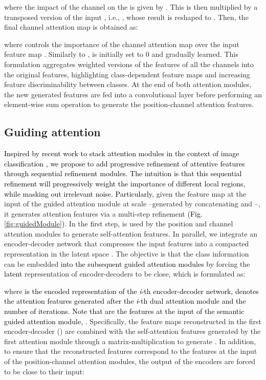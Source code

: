 \documentclass[journal]{IEEEtran}
\begin{document}
where the impact of the  channel on the  is given by . This is then multiplied by a transposed version of the input , i.e., , whose result is reshaped to . Then, the final channel attention map is obtained as:



where  controls the importance of the channel attention map over the input feature map . Similarly to ,  is initially set to 0 and gradually learned. This formulation aggregates weighted versions of the features of all the channels into the original features, highlighting class-dependent feature maps and increasing feature discriminability between classes. At the end of both attention modules, the new generated features are fed into a convolutional layer before performing an element-wise sum operation to generate the position-channel attention features.

\subsection{Guiding attention}
\label{ssec:guide}
\textcolor{black}{Inspired by recent work to stack attention modules in the context of image classification \cite{ji2018stacked}, we propose to add progressive refinement of attentive features through sequential refinement modules. The intuition is that this sequential refinement will progressively weight the importance of different local regions, while masking out irrelevant noise. Particularly,} given the feature map  at the input of the guided attention module at scale --generated by concatenating  and --, it generates attention features via a multi-step refinement \textcolor{black}{(Fig. \ref{fig:guidedModule})}. In the first step,  is used by the position and channel attention modules to generate self-attention features. In parallel, we integrate an encoder-decoder network that compresses the input features  into a compacted representation in the latent space \textcolor{black}{\cite{ji2018stacked}}. The objective is that the class information can be embedded \textcolor{black}{into the subsequent guided attention modules} by forcing the \textcolor{black}{latent} representation of encoder-decoders to be close, which is formulated as:





where \textcolor{black}{ is the encoded representation of the \textit{i}-th encoder-decoder network,  denotes the attention features generated after the \textit{i}-th dual attention module and  the number of iterations. Note that  are the features at the input of the semantic guided attention module, .} Specifically, the feature maps reconstructed in the first encoder-decoder () are combined with the self-attention features generated by the first attention module through a matrix-multiplication to generate . In addition, to ensure that the reconstructed features correspond to the features at the input of the position-channel attention modules, the output of the encoders are forced to be close to their input: 
\end{document}
